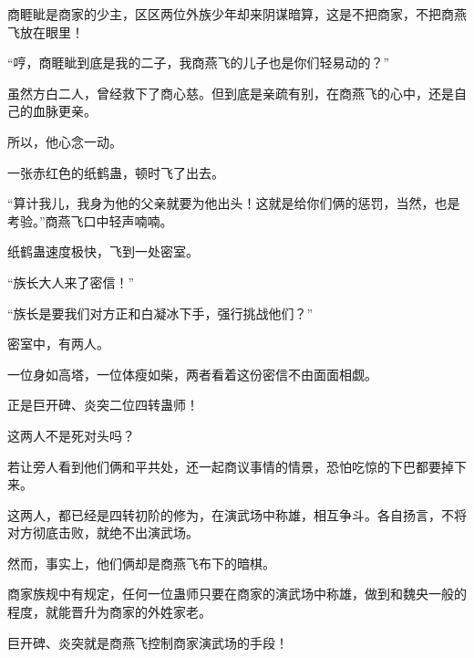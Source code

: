 \begin{this_body}
商睚眦是商家的少主，区区两位外族少年却来阴谋暗算，这是不把商家，不把商燕飞放在眼里！

“哼，商睚眦到底是我的二子，我商燕飞的儿子也是你们轻易动的？”

虽然方白二人，曾经救下了商心慈。但到底是亲疏有别，在商燕飞的心中，还是自己的血脉更亲。

所以，他心念一动。

一张赤红色的纸鹤蛊，顿时飞了出去。

“算计我儿，我身为他的父亲就要为他出头！这就是给你们俩的惩罚，当然，也是考验。”商燕飞口中轻声喃喃。

纸鹤蛊速度极快，飞到一处密室。

“族长大人来了密信！”

“族长是要我们对方正和白凝冰下手，强行挑战他们？”

密室中，有两人。

一位身如高塔，一位体瘦如柴，两者看着这份密信不由面面相觑。

正是巨开碑、炎突二位四转蛊师！

这两人不是死对头吗？

若让旁人看到他们俩和平共处，还一起商议事情的情景，恐怕吃惊的下巴都要掉下来。

这两人，都已经是四转初阶的修为，在演武场中称雄，相互争斗。各自扬言，不将对方彻底击败，就绝不出演武场。

然而，事实上，他们俩却是商燕飞布下的暗棋。

商家族规中有规定，任何一位蛊师只要在商家的演武场中称雄，做到和魏央一般的程度，就能晋升为商家的外姓家老。

巨开碑、炎突就是商燕飞控制商家演武场的手段！

\end{this_body}

